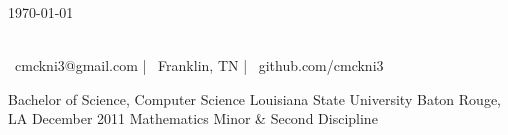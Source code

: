 \documentclass[]{awesome-cv}
\begin{document}
\makecvfooter
  {\today}
  {}
  {\thepage}
\begin{center}
	 \\
	\vspace{2mm}
	{\faEnvelope\ cmckni3@gmail.com} | {\faMapMarker\ Franklin, TN} | {\faLink\ github.com/cmckni3}
\end{center}
\begin{cventries}
	\cventry
  {Bachelor of Science, Computer Science}
	{Louisiana State University}
	{Baton Rouge, LA}
  {December 2011}
  {Mathematics Minor \& Second Discipline}
\end{cventries}
\end{document}

